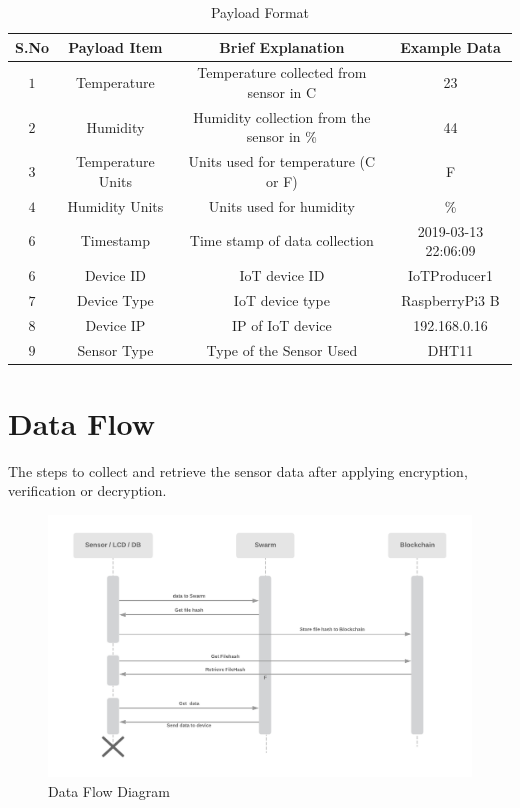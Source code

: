 \documentclass[11pt,openright]{report}
\begin{document}
\begin{table}[!htbp]
	\renewcommand{\arraystretch}{1.3}
	\caption{Payload Format}
	\label{payload_format}
	\centering
	\begin{tabular}{|c|c|c|c|}
		\hline
		\bfseries S.No & \bfseries Payload Item & \bfseries Brief Explanation & \bfseries Example Data \\
		\hline\hline
		$1$ & Temperature & Temperature collected from sensor in C & 23 \\ \hline
		$2$ & Humidity & Humidity collection from the sensor in \% & 44 \\ \hline
		$3$ & Temperature Units & Units used for temperature (C or F) & F \\ \hline
		$4$ & Humidity Units & Units used for humidity & \% \\ \hline
		$6$ & Timestamp & Time stamp of data collection & 2019-03-13 22:06:09 \\ \hline
		$6$ & Device ID & IoT device ID & IoTProducer1 \\ \hline
		$7$ & Device Type & IoT device type & RaspberryPi3 B \\ \hline
		$8$ & Device IP & IP of IoT device& 192.168.0.16 \\ \hline
		$9$ & Sensor Type & Type of the Sensor Used & DHT11 \\ \hline
	\end{tabular}
\end{table}

\section{Data Flow}
The steps to collect and retrieve the sensor data after applying encryption, verification or decryption.

\begin{figure}
	\centering
	\includegraphics[scale=0.75]{images/DataFlow.png}
	\caption{Data Flow Diagram}
	\label{fig:dataflow_diagram}
\end{figure}
\end{document}
